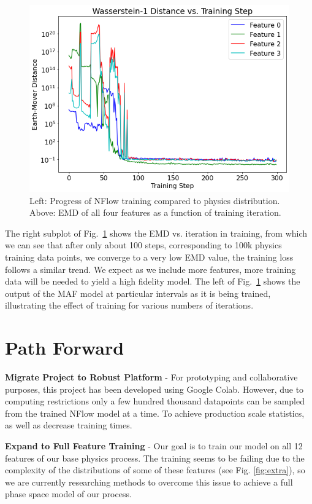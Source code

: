 \begin{figure}[!ht]
\begin{minipage}{0.4\textwidth}
        \centering
        \includegraphics[width=.98\textwidth,trim={0 0 0 0},clip]{pictures/milestoneR2/w1.png}
        \caption{Left: Progress of NFlow training compared to physics distribution. Above: EMD of all four features as a function of training iteration.}
    \end{minipage}
    \label{fig:c}
\end{figure}

The right subplot of Fig.~\ref{fig:c} shows the EMD vs. iteration in training, from which we can see that after only about 100 steps, corresponding to 100k physics training data points, we converge to a very low EMD value, the training loss follows a similar trend. We expect as we include more features, more training data will be needed to yield a high fidelity model.  The left of Fig.~\ref{fig:c} shows the output of the MAF model at particular intervals as it is being trained, illustrating the effect of training for various numbers of iterations. 

\section{Path Forward}
\textbf{Migrate Project to Robust Platform} - For prototyping and collaborative purposes, this project has been developed using Google Colab. However, due to computing restrictions only a few hundred thousand datapoints can be sampled from the trained NFlow model at a time. To achieve production scale statistics, as well as decrease training times. 

\textbf{Expand to Full Feature Training} - Our goal is to train our model on all 12 features of our base physics process. The training seems to be failing due to the complexity of the distributions of some of these features (see Fig. \ref{fig:extra}), so we are currently researching methods to overcome this issue to achieve a full phase space model of our process.

